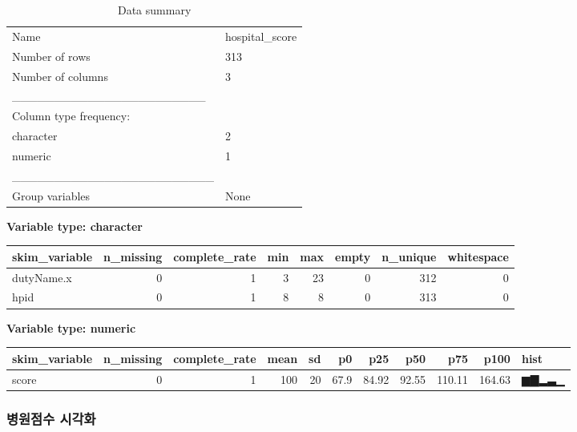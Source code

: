 \documentclass[
]{article}
\newenvironment{Shaded}{\begin{snugshade}}{\end{snugshade}}
\newcommand{\CommentTok}[1]{\textcolor[rgb]{0.56,0.35,0.01}{\textit{#1}}}
\newcommand{\DataTypeTok}[1]{\textcolor[rgb]{0.13,0.29,0.53}{#1}}
\newcommand{\DecValTok}[1]{\textcolor[rgb]{0.00,0.00,0.81}{#1}}
\newcommand{\KeywordTok}[1]{\textcolor[rgb]{0.13,0.29,0.53}{\textbf{#1}}}
\newcommand{\NormalTok}[1]{#1}
\newcommand{\OperatorTok}[1]{\textcolor[rgb]{0.81,0.36,0.00}{\textbf{#1}}}
\newcommand{\StringTok}[1]{\textcolor[rgb]{0.31,0.60,0.02}{#1}}
\begin{document}
\begin{Shaded}
\end{Shaded}

\begin{longtable}[]{@{}ll@{}}
\caption{Data summary}\tabularnewline
\toprule
\endhead
Name & hospital\_score\tabularnewline
Number of rows & 313\tabularnewline
Number of columns & 3\tabularnewline
\_\_\_\_\_\_\_\_\_\_\_\_\_\_\_\_\_\_\_\_\_\_\_ &\tabularnewline
Column type frequency: &\tabularnewline
character & 2\tabularnewline
numeric & 1\tabularnewline
\_\_\_\_\_\_\_\_\_\_\_\_\_\_\_\_\_\_\_\_\_\_\_\_ &\tabularnewline
Group variables & None\tabularnewline
\bottomrule
\end{longtable}

\textbf{Variable type: character}

\begin{longtable}[]{@{}lrrrrrrr@{}}
\toprule
skim\_variable & n\_missing & complete\_rate & min & max & empty &
n\_unique & whitespace\tabularnewline
\midrule
\endhead
dutyName.x & 0 & 1 & 3 & 23 & 0 & 312 & 0\tabularnewline
hpid & 0 & 1 & 8 & 8 & 0 & 313 & 0\tabularnewline
\bottomrule
\end{longtable}

\textbf{Variable type: numeric}

\begin{longtable}[]{@{}lrrrrrrrrrl@{}}
\toprule
skim\_variable & n\_missing & complete\_rate & mean & sd & p0 & p25 &
p50 & p75 & p100 & hist\tabularnewline
\midrule
\endhead
score & 0 & 1 & 100 & 20 & 67.9 & 84.92 & 92.55 & 110.11 & 164.63 &
▆▇▂▃▁\tabularnewline
\bottomrule
\end{longtable}

\hypertarget{uxbcd1uxc6d0uxc810uxc218-uxc2dcuxac01uxd654}{%
\subsubsection{병원점수
시각화}\label{uxbcd1uxc6d0uxc810uxc218-uxc2dcuxac01uxd654}}
\end{document}
